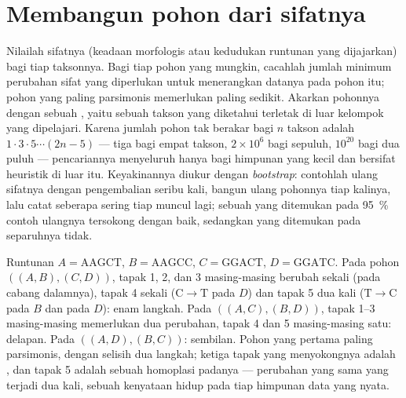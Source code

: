 \section{Membangun pohon dari sifatnya}

\begin{method}[Parsimoni]\label{meth:b2:phylogenetic-trees:parsimony}
Nilailah sifatnya (keadaan morfologis atau kedudukan runtunan yang
dijajarkan) bagi tiap taksonnya. Bagi tiap pohon yang mungkin, cacahlah
jumlah minimum perubahan sifat yang diperlukan untuk menerangkan
datanya pada pohon itu; pohon yang paling parsimonis memerlukan paling
sedikit. Akarkan pohonnya dengan sebuah \emph{}, yaitu
sebuah takson yang diketahui terletak di luar kelompok yang dipelajari.
Karena jumlah pohon tak berakar bagi $n$ takson adalah $1\cdot 3\cdot
5\cdots(2n - 5)$ --- tiga bagi empat takson, $2\times 10^{6}$ bagi
sepuluh, $10^{20}$ bagi dua puluh --- pencariannya menyeluruh hanya bagi
himpunan yang kecil dan bersifat heuristik di luar itu. Keyakinannya
diukur dengan \emph{bootstrap}: contohlah ulang sifatnya dengan
pengembalian seribu kali, bangun ulang pohonnya tiap kalinya, lalu
catat seberapa sering tiap  muncul lagi; sebuah  yang
ditemukan pada \qty{95}{\%} contoh ulangnya tersokong dengan baik,
sedangkan yang ditemukan pada separuhnya tidak.
\end{method}

\begin{example}\label{ex:b2:phylogenetic-trees:parsimony}
Runtunan $A = \mathrm{AAGCT}$, $B = \mathrm{AAGCC}$, $C =
\mathrm{GGACT}$, $D = \mathrm{GGATC}$. Pada pohon $((A,B),(C,D))$,
tapak 1, 2, dan 3 masing-masing berubah sekali (pada cabang dalamnya),
tapak 4 sekali ($\mathrm{C}\to\mathrm{T}$ pada $D$) dan tapak 5 dua kali
($\mathrm{T}\to\mathrm{C}$ pada $B$ dan pada $D$): enam langkah. Pada
$((A,C),(B,D))$, tapak 1--3 masing-masing memerlukan dua perubahan,
tapak 4 dan 5 masing-masing satu: delapan. Pada $((A,D),(B,C))$:
sembilan. Pohon yang pertama paling parsimonis, dengan selisih dua
langkah; ketiga tapak yang menyokongnya adalah , dan
tapak 5 adalah sebuah homoplasi padanya --- perubahan yang sama yang
terjadi dua kali, sebuah kenyataan hidup pada tiap himpunan data yang
nyata.
\end{example}

